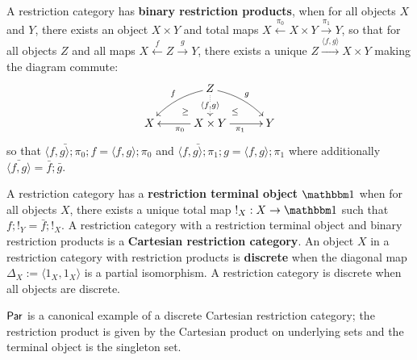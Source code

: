 \begin{definition}
A restriction category has {\bf binary restriction products}, when for all objects  $X$ and $Y$, there exists an object $X\times Y$ and total maps $X \xleftarrow{\pi_0}  X\times Y \xrightarrow{\pi_1} Y$, so that for all objects $Z$ and all maps $X \xleftarrow{f} Z \xrightarrow{g} Y$, there exists a unique $Z\xrightarrow{\langle f,g \rangle} X\times Y$ making the diagram commute:
$$
\xymatrixrowsep{0.2cm}
\xymatrixcolsep{0.4cm}
\xymatrix{
&& Z\ar@{..>}[dd]|-{\langle f, g\rangle} \ar@/_/[ddll]_f \ar@/^/[ddrr]^g &&\\
& \ar@{}[dr]|-{\geq} && \ar@{}[dl] |-{\leq} &\\
X &&  X\times Y \ar[rr]_{\pi_1} \ar[ll]^{\pi_0}  && Y
}
$$
so that $\bar{\langle f, g\rangle ;\pi_0}; f = \langle f, g\rangle ;\pi_0$ and $\bar{\langle f, g\rangle; \pi_1} ;g = \langle f, g\rangle; \pi_1$
where additionally $\bar{\langle f, g\rangle} =  \bar f ; \bar g$.


A restriction category has a {\bf restriction terminal object} $\one$ when for all objects $X$, there exists a unique total map $!_X:X\to\one$ such that $f ; !_Y = \bar  f; !_X$.
A restriction category with a restriction terminal object and binary restriction products is a {\bf Cartesian restriction category}.
An object $X$ in a restriction category with restriction products is {\bf discrete} when the diagonal map $\Delta_X:=\langle 1_X, 1_X\rangle$ is a partial isomorphism. A restriction category is discrete when all objects are discrete. 
\end{definition}
\begin{example}
$\mathsf{Par}$ is a canonical example of a discrete Cartesian restriction category; the restriction product is given by the Cartesian product on underlying sets and the terminal object is  the singleton set.
\end{example}

